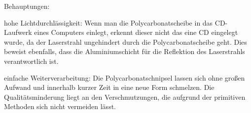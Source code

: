 Behauptungen: %
\begin{enumerate*}
    \item hohe Lichtdurchlässigkeit: Wenn man die Polycarbonatscheibe in das CD-Laufwerk eines Computers einlegt, erkennt dieser nicht das eine CD eingelegt wurde, da der Laserstrahl ungehindert durch die Polycarbonatscheibe geht. Dies beweist ebenfalls, dass die Aluminiumschicht für die Reflektion des Laserstrahls verantwortlich ist.
    \item einfache Weiterverarbeitung: Die Polycarbonatschnipsel lassen sich ohne großen Aufwand und innerhalb kurzer Zeit in eine neue Form schmelzen. Die Qualitätsminderung liegt an den Verschmutzungen, die aufgrund der primitiven Methoden sich nicht vermeiden lässt.
\end{enumerate*}
